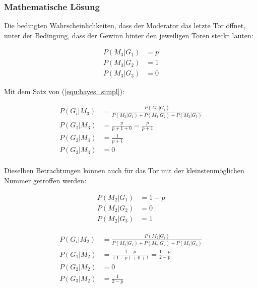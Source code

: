 \subsubsection{Mathematische Lösung}

Die bedingten Wahrscheinlichkeiten, dass der Moderator das letzte Tor öffnet, unter der Bedingung, dass der Gewinn hinter den jeweiligen Toren steckt lauten:

\begin{align*}
    P(M_3 | G_1) & = p \\
    P(M_3 | G_2) & = 1 \\
    P(M_3 | G_3) & = 0
\end{align*}

Mit dem Satz von  (\autoref{equ:bayes_simpl}):

\begin{align*}
    P(G_i | M_3) & = \frac{P(M_3 | G_i)}{P(M_3 | G_1) + P(M_3 | G_2) + P(M_3 | G_3)} \\
    P(G_1 | M_3) & = \frac{p}{p+1+0} = \frac{p}{p+1}                                 \\
    P(G_2 | M_3) & = \frac{1}{p+1}                                                   \\
    P(G_3 | M_3) & = 0                                                               \\
\end{align*}

Dieselben Betrachtungen können auch für das Tor mit der kleinstenmöglichen Nummer getroffen werden:

\begin{align*}
    P(M_2 | G_1) & = 1 - p \\
    P(M_2 | G_2) & = 0     \\
    P(M_2 | G_3) & = 1
\end{align*}

\begin{align*}
    P(G_i | M_2) & = \frac{P(M_2 | G_i)}{P(M_2 | G_1) + P(M_2 | G_2) + P(M_2 | G_3)} \\
    P(G_1 | M_2) & = \frac{1-p}{(1-p)+0+1} = \frac{1-p}{2-p}                         \\
    P(G_2 | M_2) & = 0                                                               \\
    P(G_3 | M_2) & = \frac{1}{2-p}                                                   \\
\end{align*}

